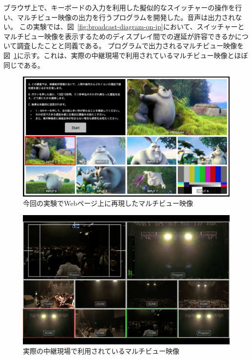 ブラウザ上で、キーボードの入力を利用した擬似的なスイッチャーの操作を行い、マルチビュー映像の出力を行うプログラム\cite{mv-delay-measurement}を開発した。音声は出力されない。
この実験では、図~\ref{fig:broadcast-diagram-on-ip}において、スイッチャーとマルチビュー映像を表示するためのディスプレイ間での遅延が許容できるかについて調査したことと同義である。
プログラムで出力されるマルチビュー映像を図~\ref{fig:mv-delay-virtual}に示す。これは、実際の中継現場で利用されているマルチビュー映像とほぼ同じである。

\begin{figure}[htbp]
  \begin{center}
    \includegraphics[bb=0 0 1294 750,width=14cm]{img/mv-delay-virtual.png}
  \end{center}
  \caption{今回の実験でWebページ上に再現したマルチビュー映像}
  \label{fig:mv-delay-virtual}
\end{figure}

\begin{figure}[htbp]
  \begin{center}
    \includegraphics[bb=0 0 1680 1050,width=14cm]{img/mv-delay-actual.png}
  \end{center}
  \caption{実際の中継現場で利用されているマルチビュー映像}
  \label{fig:mv-delay-actual}
\end{figure}

